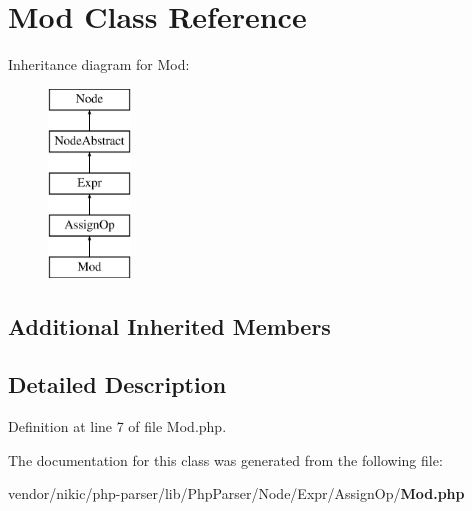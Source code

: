 \section{Mod Class Reference}
\label{class_php_parser_1_1_node_1_1_expr_1_1_assign_op_1_1_mod}
Inheritance diagram for Mod\+:\begin{figure}[H]
\begin{center}
\leavevmode
\includegraphics[height=5.000000cm]{class_php_parser_1_1_node_1_1_expr_1_1_assign_op_1_1_mod}
\end{center}
\end{figure}
\subsection*{Additional Inherited Members}


\subsection{Detailed Description}


Definition at line 7 of file Mod.\+php.



The documentation for this class was generated from the following file\+:\begin{DoxyCompactItemize}
\item 
vendor/nikic/php-\/parser/lib/\+Php\+Parser/\+Node/\+Expr/\+Assign\+Op/{\bf Mod.\+php}\end{DoxyCompactItemize}
